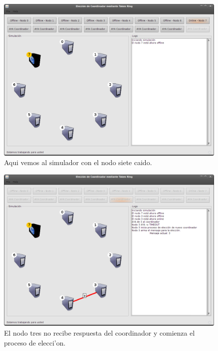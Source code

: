 \begin{figure}
\centering
 \includegraphics[scale=0.4,keepaspectratio=true]{./imagenes/tokenRing/token1.png}
 \caption{Aqui vemos al simulador con el nodo siete caido.}
\end{figure}

\begin{figure}
\centering
 \includegraphics[scale=0.4,keepaspectratio=true]{./imagenes/tokenRing/token2.png}
 \caption{El nodo tres no recibe respuesta del coordinador y comienza el proceso de elecci'on.}
\end{figure}

